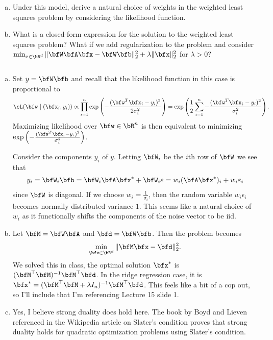 \begin{homework}[e]
    \begin{enumerate}[(a)]
      \item Under this model, derive a natural choice of weights in the weighted least squares problem by considering the likelihood function.
      \item What is a closed-form expression for the solution to the weighted least squares problem? What if we add regularization to the problem and consider $\min_{x\in \bR^d}\|\bfW\bfA\bfx - \bfW\bfb\|^2_2 + \lambda\|\bfx\|^2_2$ for $\lambda > 0$?
    \end{enumerate}
    \begin{prf}$ $
      \begin{enumerate}[(a)]
        \item Set $y = \bfW \bfb$ and recall that the likelihood function in this case is proportional to
          \begin{align*}
            \cL(\bfw \mid (\bfx_i,y_i)) \propto \prod_{i=1}^n \exp\left(-\frac{(\bfw^T\bfx_i - y_i)^2}{2\sigma_i^2}\right) = \exp\left(\frac{1}{2}\sum_{i=1}^n-\frac{(\bfw^T\bfx_i - y_i)^2}{\sigma_i^2} \right).
          \end{align*}
          Maximizing likelihood over $\bfw \in \bR^n$ is then equivalent to minimizing $\exp\left(-\frac{(\bfw^T\bfx_i - y_i)^2}{\sigma_i^2}\right)$.

          Consider the components $y_i$ of $y$. Letting $\bfW_i$ be the $i$th row of $\bfW$ we see that
          \begin{align*}
            y_i = \bfW_i \bfb = \bfW_i\bfA\bfx^* + \bfW_i\epsilon = w_i(\bfA\bfx^*)_i + w_i\epsilon_i
          \end{align*}
          since $\bfW$ is diagonal. If we choose $w_i = \frac{1}{\sigma_i}$, then the random variable $w_i\epsilon_i$ becomes normally distributed variance $1$. This seems like a natural choice of $w_i$ as it functionally shifts the components of the noise vector to be iid.
        \item Let $\bfM = \bfW\bfA$ and $\bfd = \bfW\bfb$. Then the problem becomes
          \begin{align*}
            \min_{\bfx \in \bR^d} \|\bfM\bfx - \bfd\|^2_2.
          \end{align*}
          We solved this in class, the optimal solution $\bfx^*$ is $(\bfM^\top \bfM)^{-1}\bfM^{\top} \bfd$. In the ridge regression case, it is $\bfx^* = (\bfM^\top\bfM + \lambda I_{n})^{-1}\bfM^{\top}\bfd$. This feels like a bit of a cop out, so I'll include that I'm referencing Lecture 15 slide 1.
        \item Yes, I believe strong duality does hold here. The book by Boyd and Lieven referenced in the Wikipedia article on Slater's condition proves that strong duality holds for quadratic optimization problems using Slater's condition.
      \end{enumerate}
    \end{prf}


\end{homework}
